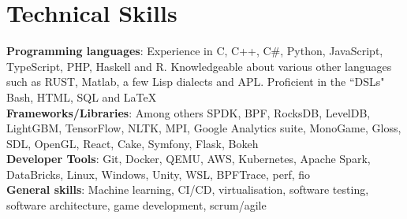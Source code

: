 \documentclass[letterpaper,11pt]{article}
\begin{document}
%
\section{Technical Skills}
 \begin{itemize}[leftmargin=0.15in, label={}]
    \small{\item{
     \textbf{Programming languages}{: Experience in C, C++, C\#, Python, JavaScript, TypeScript, PHP, Haskell and R. Knowledgeable about various other languages such as RUST, Matlab, a few Lisp dialects and APL. Proficient in the ``DSLs" Bash, HTML, SQL and LaTeX} \\
     \textbf{Frameworks/Libraries}{: Among others SPDK, BPF, RocksDB, LevelDB, LightGBM, TensorFlow, NLTK, MPI, Google Analytics suite, MonoGame, Gloss, SDL, OpenGL,  React, Cake, Symfony, Flask, Bokeh} \\
     \textbf{Developer Tools}{: Git, Docker, QEMU, AWS, Kubernetes, Apache Spark, DataBricks, Linux, Windows, Unity, WSL,  BPFTrace, perf, fio} \\
     \textbf{General skills}{: Machine learning, CI/CD, virtualisation, software testing, software architecture, game development, scrum/agile }
     }}
 \end{itemize}


\end{document}
